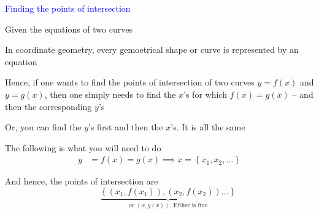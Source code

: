 \documentclass[14pt,fleqn]{extarticle}
\begin{document}
 

\begin{skill}
\begin{narrow}
\textcolor{blue}{Finding the points of intersection}

Given the equations of two curves 
\end{narrow}

\reason 

In coordinate geometry, every gemoetrical shape or curve is represented by an equation \newline 


Hence, if one wants to find the points of intersection of two curves $y=f(x)$ and $y=g(x)$, then one simply needs to find the $x$'s for which $f(x) = g(x)$ -- and then the corresponding $y$'s \newline 

Or, you can find the $y$'s first and then the $x$'s. It is all the same \newline 

The following is what you will need to do  
\begin{align}
	y &= f(x) = g(x) \implies x = \left\lbrace x_1, x_2, \ldots\right\rbrace	
\end{align}

And hence, the points of intersection are 
\[ \qquad \underbrace{\left\lbrace\left(x_1, f(x_1) \right), \left(x_2, f(x_2) \right)\ldots\right\rbrace}_{\text{or }\left(x,g(x) \right).\text{ Either is fine}} \] 
\end{skill} 
\end{document}
